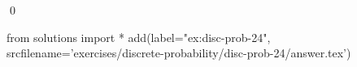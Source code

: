 
\begin{ex} 
  \label{ex:disc-prob-24}
  
  \qed
\end{ex} 
\begin{python0}
from solutions import *
add(label="ex:disc-prob-24",
    srcfilename='exercises/discrete-probability/disc-prob-24/answer.tex') 
\end{python0}
